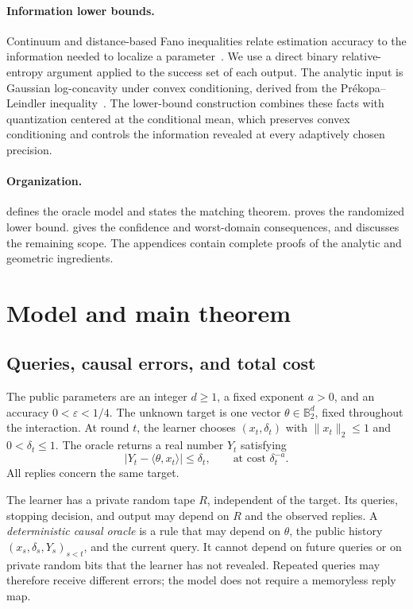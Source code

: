 \documentclass[11pt,a4paper]{article}
\newcommand{\B}{\mathbb B}
\newcommand{\eps}{\varepsilon}
\newcommand{\ip}[2]{\langle #1,#2\rangle}
\newcommand{\norm}[1]{\lVert #1\rVert}
\newcommand{\abs}[1]{\lvert #1\rvert}
\theoremstyle{definition}
\theoremstyle{remark}
\begin{document}
\paragraph{Information lower bounds.}
Continuum and distance-based Fano inequalities relate estimation accuracy to the information needed to localize a parameter~\cite{DW13}. We use a direct binary relative-entropy argument applied to the success set of each output. The analytic input is Gaussian log-concavity under convex conditioning, derived from the Pr\'ekopa--Leindler inequality~\cite{Prekopa73}. The lower-bound construction combines these facts with quantization centered at the conditional mean, which preserves convex conditioning and controls the information revealed at every adaptively chosen precision.

\paragraph{Organization.}
 defines the oracle model and states the matching theorem.  proves the randomized lower bound.  gives the confidence and worst-domain consequences, and  discusses the remaining scope. The appendices contain complete proofs of the analytic and geometric ingredients.

\section{Model and main theorem}\label{sec:model}
\subsection{Queries, causal errors, and total cost}
The public parameters are an integer $d\ge1$, a fixed exponent $a>0$, and an accuracy $0<\eps<1/4$. The unknown target is one vector $\theta\in\B_2^d$, fixed throughout the interaction. At round $t$, the learner chooses $(x_t,\delta_t)$ with $\norm{x_t}_2\le1$ and $0<\delta_t\le1$. The oracle returns a real number $Y_t$ satisfying
\begin{equation}\label{eq:oracle}
 \abs{Y_t-\ip{\theta}{x_t}}\le\delta_t,
 \qquad\text{at cost }\delta_t^{-a}.
\end{equation}
All replies concern the same target.

The learner has a private random tape $R$, independent of the target. Its queries, stopping decision, and output may depend on $R$ and the observed replies. A \emph{deterministic causal oracle} is a rule that may depend on $\theta$, the public history $(x_s,\delta_s,Y_s)_{s<t}$, and the current query. It cannot depend on future queries or on private random bits that the learner has not revealed. Repeated queries may therefore receive different errors; the model does not require a memoryless reply map.
\end{document}
